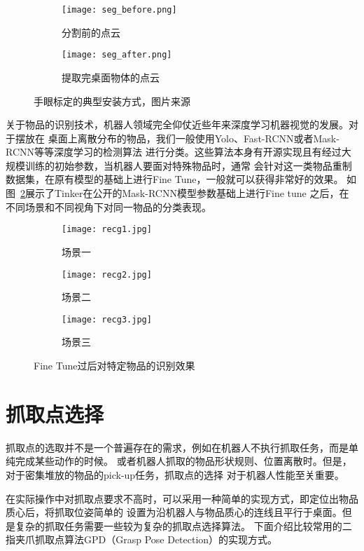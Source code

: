 \begin{figure}
\centering
\begin{subfigure}{.5\textwidth}
  \centering
  \texttt{[image: seg\_before.png]}
  \caption{分割前的点云}
\end{subfigure}%
\begin{subfigure}{.5\textwidth}
  \centering
  \texttt{[image: seg\_after.png]}
  \caption{提取完桌面物体的点云}
\end{subfigure}
\caption{手眼标定的典型安装方式，图片来源\cite{easy_handeye}}
\label{fig:segmentation}
\end{figure}


关于物品的识别技术，机器人领域完全仰仗近些年来深度学习机器视觉的发展。对于摆放在
桌面上离散分布的物品，我们一般使用Yolo、Fast-RCNN或者Mask-RCNN等等深度学习的检测算法
进行分类。这些算法本身有开源实现且有经过大规模训练的初始参数，当机器人要面对特殊物品时，通常
会针对这一类物品重制数据集，在原有模型的基础上进行Fine Tune，一般就可以获得非常好的效果。
如图~\ref{fig:recognition}展示了Tinker在公开的Mask-RCNN模型参数基础上进行Fine tune
之后，在不同场景和不同视角下对同一物品的分类表现。

\begin{figure}
\centering
\begin{subfigure}{.33\textwidth}
  \centering
  \texttt{[image: recg1.jpg]}
  \caption{场景一}
\end{subfigure}%
\begin{subfigure}{.33\textwidth}
  \centering
  \texttt{[image: recg2.jpg]}
  \caption{场景二}
\end{subfigure}
\begin{subfigure}{.33\textwidth}
  \centering
  \texttt{[image: recg3.jpg]}
  \caption{场景三}
\end{subfigure}
\caption{Fine Tune过后对特定物品的识别效果}
\label{fig:recognition}
\end{figure}

\section{抓取点选择}

抓取点的选取并不是一个普遍存在的需求，例如在机器人不执行抓取任务，而是单纯完成某些动作的时候。
或者机器人抓取的物品形状规则、位置离散时。但是，对于密集堆放的物品的pick-up任务，抓取点的选择
对于机器人性能至关重要。

在实际操作中对抓取点要求不高时，可以采用一种简单的实现方式，即定位出物品质心后，将抓取位姿简单的
设置为沿机器人与物品质心的连线且平行于桌面。但是复杂的抓取任务需要一些较为复杂的抓取点选择算法。
下面介绍比较常用的二指夹爪抓取点算法GPD（Grasp Pose Detection）\cite{ten2017grasp}的实现方式。

